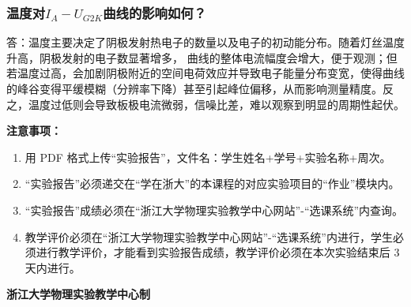 \documentclass[10pt,a4paper]{ctexart}
\newcommand{\sihao}{\fontsize{14pt}{18pt}\selectfont}
\newcommand{\xiaosi}{\fontsize{12pt}{16pt}\selectfont}
\begin{document}
    \subsubsection*{温度对$I_A - U_{G2K}$曲线的影响如何？}

    答：温度主要决定了阴极发射热电子的数量以及电子的初动能分布。随着灯丝温度升高，阴极发射的电子数显著增多， 曲线的整体电流幅度会增大，便于观测；但若温度过高，会加剧阴极附近的空间电荷效应并导致电子能量分布变宽，使得曲线的峰谷变得平缓模糊（分辨率下降）甚至引起峰位偏移，从而影响测量精度。反之，温度过低则会导致板极电流微弱，信噪比差，难以观察到明显的周期性起伏。

\newpage

\sihao\textbf{注意事项：}
\xiaosi
\begin{enumerate}
    \item  用 PDF 格式上传“实验报告”，文件名：学生姓名+学号+实验名称+周次。
    \item  “实验报告”必须递交在“学在浙大”的本课程的对应实验项目的“作业”模块内。
    \item  “实验报告”成绩必须在“浙江大学物理实验教学中心网站”-“选课系统”内查询。
    \item 教学评价必须在“浙江大学物理实验教学中心网站”-“选课系统”内进行，学生必须进行教学评价，才能看到实验报告成绩，教学评价必须在本次实验结束后 3 天内进行。
\end{enumerate}

\vspace{1cm}
\xiaosi\centering \textbf{浙江大学物理实验教学中心制}
\end{document}
